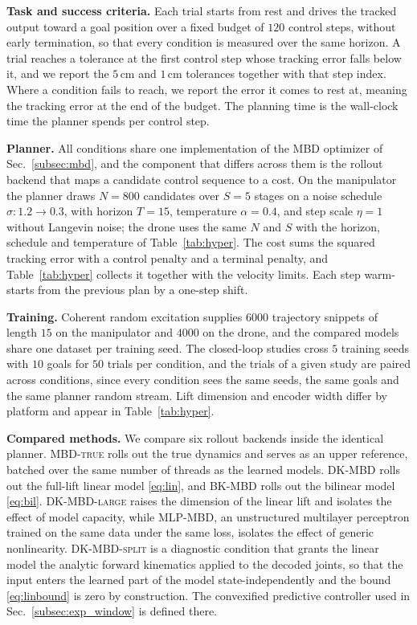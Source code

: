 \documentclass[letterpaper,10pt,conference]{ieeeconf}
\newcommand{\mbdtrue}{\textsc{MBD-true}}
\newcommand{\dkmbd}{\textsc{DK-MBD}}
\newcommand{\dksplit}{\textsc{DK-MBD-split}}
\newcommand{\bkmbd}{\textsc{BK-MBD}}
\begin{document}
\textbf{Task and success criteria.}
Each trial starts from rest and drives the tracked output toward a goal position over a fixed budget of $120$ control steps, without early termination, so that every condition is measured over the same horizon.
A trial reaches a tolerance at the first control step whose tracking error falls below it, and we report the $5$\,cm and $1$\,cm tolerances together with that step index.
Where a condition fails to reach, we report the error it comes to rest at, meaning the tracking error at the end of the budget.
The planning time is the wall-clock time the planner spends per control step.

\textbf{Planner.}
All conditions share one implementation of the MBD optimizer of Sec.~\ref{subsec:mbd}, and the component that differs across them is the rollout backend that maps a candidate control sequence to a cost.
On the manipulator the planner draws $N = 800$ candidates over $S = 5$ stages on a noise schedule $\sigma\!: 1.2 \to 0.3$, with horizon $T = 15$, temperature $\alpha = 0.4$, and step scale $\eta = 1$ without Langevin noise; the drone uses the same $N$ and $S$ with the horizon, schedule and temperature of Table~\ref{tab:hyper}.
The cost sums the squared tracking error with a control penalty and a terminal penalty, and Table~\ref{tab:hyper} collects it together with the velocity limits.
Each step warm-starts from the previous plan by a one-step shift.

\textbf{Training.}
Coherent random excitation supplies $6000$ trajectory snippets of length $15$ on the manipulator and $4000$ on the drone, and the compared models share one dataset per training seed.
The closed-loop studies cross $5$ training seeds with $10$ goals for $50$ trials per condition, and the trials of a given study are paired across conditions, since every condition sees the same seeds, the same goals and the same planner random stream.
Lift dimension and encoder width differ by platform and appear in Table~\ref{tab:hyper}.

\textbf{Compared methods.}
We compare six rollout backends inside the identical planner.
\mbdtrue{} rolls out the true dynamics and serves as an upper reference, batched over the same number of threads as the learned models.
\dkmbd{} rolls out the full-lift linear model \eqref{eq:lin}, and \bkmbd{} rolls out the bilinear model \eqref{eq:bil}.
\textsc{DK-MBD-large} raises the dimension of the linear lift and isolates the effect of model capacity, while \textsc{MLP-MBD}, an unstructured multilayer perceptron trained on the same data under the same loss, isolates the effect of generic nonlinearity.
\dksplit{} is a diagnostic condition that grants the linear model the analytic forward kinematics applied to the decoded joints, so that the input enters the learned part of the model state-independently and the bound \eqref{eq:linbound} is zero by construction.
The convexified predictive controller used in Sec.~\ref{subsec:exp_window} is defined there.
\end{document}
